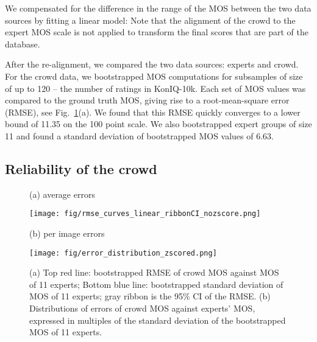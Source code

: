 \documentclass[10pt,journal,compsoc]{IEEEtran}
\begin{document}
We compensated for the difference in the range of the MOS between the two data sources by fitting a linear model: 
 Note that the alignment of the crowd to the expert MOS scale is not applied to transform the final scores that are part of the database.

After the re-alignment, we compared the two data sources: experts and crowd. For the crowd data, we bootstrapped MOS computations for subsamples of size of up to 120 -- the number of ratings in KonIQ-10k. Each set of MOS values was compared to the ground truth MOS, giving rise to a root-mean-square error (RMSE), see Fig.~\ref{fig:rmse_curves}(a). We found that this RMSE quickly converges to a lower bound of 11.35 on the 100 point scale. We also bootstrapped expert groups of size 11 and found a standard deviation of bootstrapped MOS values of 6.63.












\subsection{Reliability of the crowd}
\label{sec:reliability}




\begin{figure}[!t]
\centering
\begin{minipage}{.46\linewidth}
\centerline{(a) average errors}
\centerline{\texttt{[image: fig/rmse\_curves\_linear\_ribbonCI\_nozscore.png]}}
\end{minipage}\begin{minipage}{.46\linewidth}
\centerline{(b) per image errors}
\centerline{\texttt{[image: fig/error\_distribution\_zscored.png]}}
\end{minipage}

\caption{(a) Top red line: bootstrapped RMSE of crowd  MOS against MOS of 11 experts; Bottom blue line: bootstrapped standard deviation of MOS of 11 experts; gray ribbon is the 95\% CI of the RMSE. (b) Distributions of errors of crowd MOS against experts' MOS, expressed in multiples of the standard deviation of the bootstrapped MOS of 11 experts.}
\label{fig:rmse_curves}
\end{figure}
\end{document}
